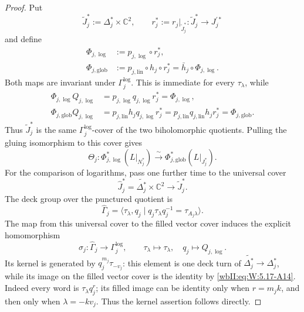 \begin{proof}
Put
\[
 \widetilde J_j^*:=\Delta_j^*\times\mathbb C^2,
 \qquad
 r_j^*:=r_j|_{\widetilde J_j^*}:
 \widetilde J_j^*\longrightarrow J_j^{\prime *}
\]
and define
\[
\begin{aligned}
 \Phi_{j,\log}
  &:=p_{j,\log}\circ r_j^*,\\
 \Phi_{j,\mathrm{glob}}
  &:=p_{j,\mathrm{lin}}\circ h_j\circ r_j^*
   =\bar h_j\circ\Phi_{j,\log}.
\end{aligned}
\]
Both maps are invariant under \(\Gamma_j^{\log}\).  This is immediate for
every \(\tau_\lambda\), while
\[
\begin{aligned}
 \Phi_{j,\log}Q_{j,\log}
 &=p_{j,\log}q_{j,\log}r_j^*
  =\Phi_{j,\log},\\
 \Phi_{j,\mathrm{glob}}Q_{j,\log}
 &=p_{j,\mathrm{lin}}h_jq_{j,\log}r_j^*
  =p_{j,\mathrm{lin}}q_{j,\mathrm{lin}}h_jr_j^*
  =\Phi_{j,\mathrm{glob}}.
\end{aligned}
\]
Thus \(\widetilde J_j^*\) is the same \(\Gamma_j^{\log}\)-cover of the two
biholomorphic quotients.  Pulling the gluing isomorphism to this cover gives
\[
 \Theta_j:
 \Phi_{j,\log}^*(L|_{N_j^*})
 \xrightarrow{\ \sim\ }
 \Phi_{j,\mathrm{glob}}^*(L|_{J_j^*}).
\]
For the comparison of logarithms, pass one further time to the universal
cover
\[
 \widehat J_j^*=\widetilde{\Delta_j^*}\times\mathbb C^2
 \longrightarrow \widetilde J_j^*.
\]
The deck group over the punctured quotient is
\[
 \widehat\Gamma_j=
 \langle\tau_\lambda,q_j\mid
 q_j\tau_\lambda q_j^{-1}=\tau_{A_j\lambda}\rangle.
\]
The map from this universal cover to the filled vector cover induces the
explicit homomorphism
\[
 \sigma_j:\widehat\Gamma_j\longrightarrow\Gamma_j^{\log},
 \qquad \tau_\lambda\longmapsto\tau_\lambda,
 \quad q_j\longmapsto Q_{j,\log}.
\]
Its kernel is generated by
\(q_j^{m_j}\tau_{-v_j}\): this element is one deck turn of
\(\widetilde{\Delta_j^*}\to\Delta_j^*\), while its image on the
filled vector cover is the identity by \eqref{wbII:eq:W:5.17-A14}.
Indeed every word is \(\tau_\lambda q_j^r\); its filled image can be
identity only when \(r=m_jk\), and then only when
\(\lambda=-kv_j\).  Thus the kernel assertion follows directly.


\end{proof}
